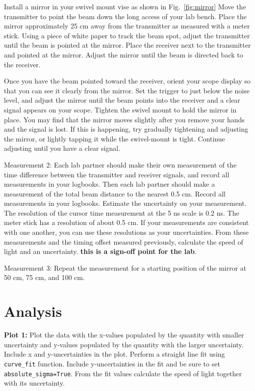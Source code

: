 Install a mirror in your swivel mount vise as shown in
Fig.~\ref{fig:mirror} Move the transmitter to point the beam down the
long access of your lab bench.  Place the mirror approximately 25 cm
away from the transmitter as measured with a meter stick.  Using a
piece of white paper to track the beam spot, adjust the transmitter
until the beam is pointed at the mirror.  Place the receiver next to
the transmitter and pointed at the mirror.  Adjust the mirror until
the beam is directed back to the receiver. 

Once you have the beam pointed toward the receiver, orient your scope
display so that you can see it clearly from the mirror.  Set the
trigger to just below the noise level, and adjust the mirror until the
beam points into the receiver and a clear signal appears on your
scope.  Tighten the swivel mount to hold the mirror in place.  You may
find that the mirror moves slightly after you remove your hands and
the signal is lost.  If this is happening, try gradually tightening
and adjusting the mirror, or lightly tapping it while the swivel-mount
is tight.  Continue adjusting until you have a clear signal.  

{Measurement 2:} Each lab partner should make their own measurement of
the time difference between the transmitter and receiver signals, and
record all measurements in your logbooks.  Then each lab partner
should make a measurement of the total beam distance to the nearest
0.5 cm.  Record all measurements in your logbooks.  Estimate the
uncertainty on your measurement.  The resolution of the cursor time
measurement at the 5 ns scale is 0.2 ns.  The meter stick has a
resolution of about 0.5 cm.  If your measurements are consistent with
one another, you can use these resolutions as your uncertainties.
From these measurements and the timing offset measured previously,
calculate the speed of light and an uncertainty.  {\bf this is a
  sign-off point for the lab}.

{Measurement 3:} Repeat the measurement for a starting position of the
mirror at 50 cm, 75 cm, and 100 cm.

\section{Analysis}

\textbf{Plot 1:} Plot the data with the x-values populated by the
quantity with smaller uncertainty and y-values populated by the
quantity with the larger uncertainty. Include x and y-uncertainties in
the plot. Perform a straight line fit using {\tt curve{\_}fit}
function. Include y-uncertainties in the fit and be sure to set {\tt absolute{\_}sigma=True}.  From the fit values
calculate the speed of light together with its uncertainty.

